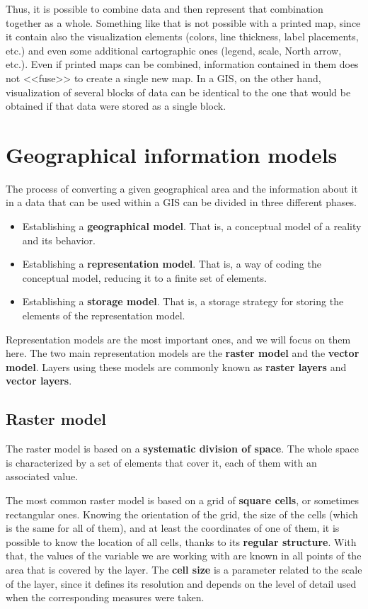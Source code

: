 Thus, it is possible to combine data and then represent that combination together as a whole. Something like that is not possible with a printed map, since it contain also the visualization elements (colors, line thickness, label placements, etc.) and even some additional cartographic ones (legend, scale, North arrow, etc.). Even if printed maps can be combined, information contained in them does not <<fuse>> to create a single new map. In a GIS, on the other hand, visualization of several blocks of data can be identical to the one that would be obtained if that data were stored as a single block.


\section{Geographical information models}

The process of converting a given geographical area and the information about it in a data that can be used within a GIS can be divided in three different phases.

\begin{itemize}
 \item Establishing a \textbf{geographical model}. That is, a conceptual model of a reality and its behavior.
\item Establishing a \textbf{representation model}. That is, a way of coding the conceptual model, reducing it to a finite set of elements.
\item Establishing a \textbf{storage model}. That is, a storage strategy for storing the elements of the representation model.
\end{itemize}

Representation models are the most important ones, and we will focus on them here. The two main representation models are the \textbf{raster model} and the \textbf{vector model}. Layers using these models are commonly known as \textbf{raster layers} and \textbf{vector layers}.

\subsection{Raster model}

The raster model is based on a \textbf{systematic division of space}. The whole space is characterized by a set of elements that cover it, each of them with an associated value.

The most common raster model is based on a grid of \textbf{square cells}, or sometimes rectangular ones. Knowing the orientation of the grid, the size of  the cells (which is the same for all of them), and at least the coordinates of one of them, it is possible to know the location of all cells, thanks to its \textbf{regular structure}. With that, the values of the variable we are working with are known in all points of the area that is covered by the layer. The \textbf{cell size} is a parameter related to the scale of the layer, since it defines its resolution and depends on the level of detail used when the corresponding measures were taken.

